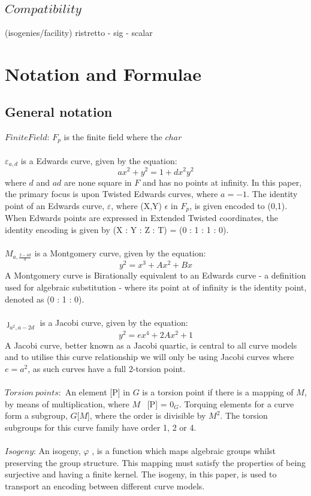 \documentclass{article}
\begin{document}
\subsection{$Compatibility$} (isogenies/facility) ristretto - sig - scalar

\section{Notation and Formulae} 
\subsection{General notation}
$Finite Field$: $F_p$ is the finite field where the $char$ \\\\
$\varepsilon_{a,d}$ is a Edwards curve, given by the equation: $$ {a}x^2+y^2=1+{d}x^2y^2 $$ where {$d$} and {$ad$} are none square in $F$ and has no points at infinity. In this paper, the primary focus is upon Twisted Edwards curves, where $a = -1$. The identity point of an Edwards curve, $\varepsilon$, where (X,Y) $\epsilon$ in $F_p$, is given encoded to (0,1). When Edwards points are expressed in Extended Twisted coordinates, the identity encoding is given by (X : Y : Z : T) = (0 : 1 : 1 : 0).\\\\
${M}_{a,\frac{2-4d}{a}}$ is a Montgomery curve, given by the equation: $$ y^2=x^3+Ax^2+Bx $$ A Montgomery curve is Birationally equivalent to an Edwards curve - a definition used for algebraic substitution -  where its point at of infinity is the identity point, denoted as (0 : 1 : 0).\\\\  
$\jmath_{a^{2},a−{2d}}$ is a Jacobi curve, given by the equation: $$y
^2 = {e}x^4 + 2Ax^2 + 1$$ A Jacobi curve, better known as a Jacobi quartic, is central to all curve models and to utilise this curve relationship we will only be using Jacobi curves where $e = {a}^2$, as such curves have a full 2-torsion point.\\\\
$Torsion\ points$:\ An element [P] in  $G$ is a torsion point if there is a mapping of $M$, by means of multiplication, where $M$ \cdot\ [P] = $0_{G}$. Torquing elements for a curve form a subgroup, $G$[$M$], where the order is divisible by ${M}^2$. The torsion subgroups for this curve family have order 1, 2 or 4.  \\\\ 
$Isogeny$: An isogeny, $\varphi$ , is a function which maps algebraic groups whilst preserving the group structure. This mapping must satisfy the properties of being surjective and having a finite kernel. The isogeny, in this paper, is used to transport an encoding between different curve models.\\\\
\end{document}
